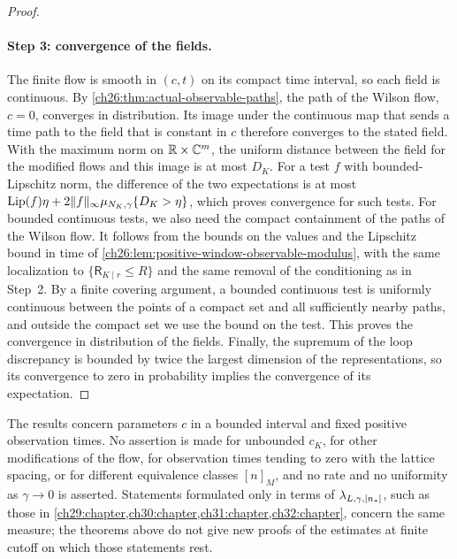 \begin{proof}
\paragraph{Step 3: convergence of the fields.}
The finite flow is smooth in $(c,t)$ on its compact time interval, so each field is continuous. By \cref{ch26:thm:actual-observable-paths}, the path of the Wilson flow, $c=0$, converges in distribution. Its image under the continuous map that sends a time path to the field that is constant in $c$ therefore converges to the stated field. With the maximum norm on $\mathbb R\times\mathbb C^m$, the uniform distance between the field for the modified flows and this image is at most $D_K$. For a test $f$ with bounded-Lipschitz norm, the difference of the two expectations is at most $\operatorname{Lip}(f)\eta+2\lVert f\rVert_\infty\mu_{N_K,\gamma}\{D_K>\eta\}$, which proves convergence for such tests. For bounded continuous tests, we also need the compact containment of the paths of the Wilson flow. It follows from the bounds on the values and the Lipschitz bound in time of \cref{ch26:lem:positive-window-observable-modulus}, with the same localization to $\{\mathsf R_{K\mid r}\le R\}$ and the same removal of the conditioning as in Step~2. By a finite covering argument, a bounded continuous test is uniformly continuous between the points of a compact set and all sufficiently nearby paths, and outside the compact set we use the bound on the test. This proves the convergence in distribution of the fields. Finally, the supremum of the loop discrepancy is bounded by twice the largest dimension of the representations, so its convergence to zero in probability implies the convergence of its expectation.
\end{proof}

\begin{remark}\label{ch26:rem:modified-flow-scope}
The results concern parameters $c$ in a bounded interval and fixed positive observation times. No assertion is made for unbounded $c_K$, for other modifications of the flow, for observation times tending to zero with the lattice spacing, or for different equivalence classes $[n]_M$, and no rate and no uniformity as $\gamma\to0$ is asserted. Statements formulated only in terms of $\lambda_{L,\gamma,[n_*]}$, such as those in \cref{ch29:chapter,ch30:chapter,ch31:chapter,ch32:chapter}, concern the same measure; the theorems above do not give new proofs of the estimates at finite cutoff on which those statements rest.
\end{remark}

